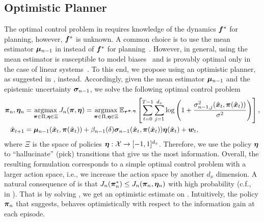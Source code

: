 \subsection{Optimistic Planner}
The optimal control problem in  requires knowledge of the dynamics ${\bm{f}}^*$ for planning, however, ${\bm{f}}^*$ is unknown.
A common choice is to use the mean estimator ${\bm{\mu}}_{n-1}$ in  instead of ${\bm{f}}^*$ for planning~\citep {active_learning_gp}. However, in general, using the mean estimator is susceptible to model biases~\citep{chua2018pets} and is provably optimal only in the case of linear systems~\citep{linearExploration}. 
To this end, we propose using an optimistic planner, as suggested in \cite{curi2020efficient}, instead. Accordingly, given the mean estimator ${\bm{\mu}}_{n-1}$ and the epistemic uncertainty ${\bm{\sigma}}_{n-1}$, we solve the following optimal control problem
\begin{align}
   {\bm{\pi}}_n,  {\bm{\eta}}_n &= \operatorname*{arg\!\max}_{{\bm{\pi}} \in \Pi, {\bm{\eta}} \in \Xi} J_n({\bm{\pi}}, {\bm{\eta}}) = \operatorname*{arg\!\max}_{{\bm{\pi}} \in \Pi, {\bm{\eta}} \in \Xi} \mathbb{E}_{{\bm{\tau}}^{{\bm{\pi}}, {\bm{\eta}}}}\left[\sum_{t=0}^{T-1} \sum^{d_x}_{j=1} \log \left(1 + \frac{\sigma_{n-1, j}^2({\hat{\bm{x}}}_t, {\bm{\pi}}({\hat{\bm{x}}}_t))}{\sigma^2}\right)\right],       \label{eq:exploration_op_optimistic} \\
      {\hat{\bm{x}}}_{t+1} &= {\bm{\mu}}_{n-1}({\hat{\bm{x}}}_t, {\bm{\pi}}({\hat{\bm{x}}}_t)) + \beta_{n-1}(\delta){\bm{\sigma}}_{n-1}({\hat{\bm{x}}}_t, {\bm{\pi}}({\hat{\bm{x}}}_t)) {\bm{\eta}}({\hat{\bm{x}}}_t) + {\bm{w}}_t, \notag
\end{align}
where $\Xi$ is the space of policies ${\bm{\eta}}: {\mathcal{X}} \to [-1, 1]^{d_x}$.
Therefore, we use the policy ${\bm{\eta}}$ to ``hallucinate'' (pick) transitions that give us the most information. Overall, the resulting formulation corresponds to a simple optimal control problem with a larger action space, i.e., we increase the action space by another $d_x$ dimension. A natural consequence of  is that $J_n({\bm{\pi}}_n^*) \leq J_n({\bm{\pi}}_n,  {\bm{\eta}}_n)$ with high probability (c.f.,~ in ). That is by solving , we get an optimistic estimate on .
Intuitively, the policy ${\bm{\pi}}_{n}$ that \opacex suggests, behaves optimistically with respect to the information gain at each episode. 

